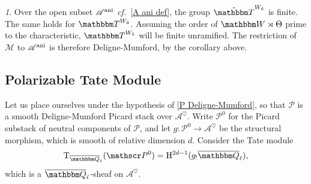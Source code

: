 \documentclass[12pt,english]{smfart}
\numberwithin{equation}{subsection}
\theoremstyle{remark}
\newtheorem{numero}[equation]{}
\newcommand\calA{{\mathscr A}}
\newcommand\calP{{\mathscr P}}
\newcommand\calM{{\mathscr M}}
\newcommand\rmT{{\rm T}}
\newcommand\QQ{{\mathbbm Q}}
\newcommand\bbW{{\mathbbm W}}
\newcommand\bbT{{\mathbbm T}}
\newcommand\rmH{{\rm H}}
\newcommand\cf{{\it cf.\ }}
\newcommand\ani{{\rm ani}}
\newcommand\Ql{{\overline\QQ_\ell}}
\begin{document}
\begin{numero}\label{ani DM}
Over the open subset $\calA^\ani$ \cf \ref{A ani def}, the group $\hat\bbT^{W_{\tilde a}}$ is finite. The same holds for $\bbT^{W_{\tilde a}}$. Assuming the order of $\bbW\rtimes\Theta$ prime to the characteristic, $\bbT^{W_{\tilde a}}$ will be finite unramified. The restriction of $\calM$ to $\calA^\ani$ is therefore Deligne-Mumford, by the corollary above.
\end{numero}



\subsection{Polarizable Tate Module}\label{subsection : module de Tate polarisable}

Let us place ourselves under the hypothesis of \ref{P Deligne-Mumford}, so that $\calP$ is a smooth Deligne-Mumford Picard stack over $\calA^\heartsuit$. Write $\calP^0$ for the Picard substack of neutral components of $\calP$, and let $g:\calP^0\rightarrow\calA^\heartsuit$ be the structural morphism, which is smooth of relative dimension $d$. Consider the Tate module
$$\rmT_\Ql(\calP^0)=\rmH^{2d-1}(g_!\Ql),$$
which is a $\Ql$-sheaf on $\calA^\heartsuit$.
\end{document}
